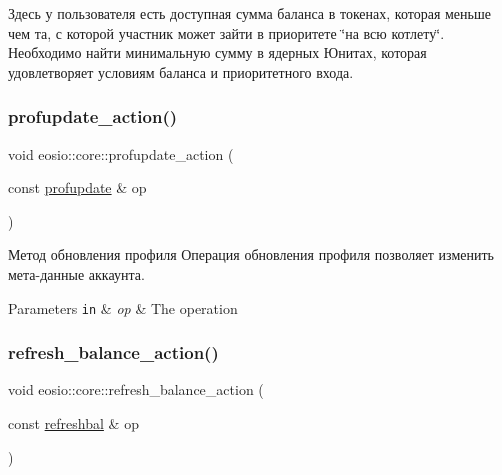 Здесь у пользователя есть доступная сумма баланса в токенах, которая меньше чем та, с которой участник может зайти в приоритете \char`\"{}на всю котлету\char`\"{}. Необходимо найти минимальную сумму в ядерных Юнитах, которая удовлетворяет условиям баланса и приоритетного входа.\mbox{\label{structeosio_1_1core_a1ce681caf15438f64bd6cef01c008079}} 
\subsubsection{\texorpdfstring{profupdate\+\_\+action()}{profupdate\_action()}}
{\footnotesize\ttfamily void eosio\+::core\+::profupdate\+\_\+action (\begin{DoxyParamCaption}\item[{const \mbox{\hyperlink{structeosio_1_1profupdate}{profupdate}} \&}]{op }\end{DoxyParamCaption})\hspace{0.3cm}{\ttfamily [inline]}}



Метод обновления профиля Операция обновления профиля позволяет изменить мета-\/данные аккаунта. 


\begin{DoxyParams}[1]{Parameters}
\mbox{\tt in}  & {\em op} & The operation \\
\hline
\end{DoxyParams}
\mbox{\label{structeosio_1_1core_aebbed426e5072f1c0f43f051ff3c6e9d}} 
\subsubsection{\texorpdfstring{refresh\+\_\+balance\+\_\+action()}{refresh\_balance\_action()}}
{\footnotesize\ttfamily void eosio\+::core\+::refresh\+\_\+balance\+\_\+action (\begin{DoxyParamCaption}\item[{const \mbox{\hyperlink{structeosio_1_1refreshbal}{refreshbal}} \&}]{op }\end{DoxyParamCaption})\hspace{0.3cm}{\ttfamily [inline]}}



